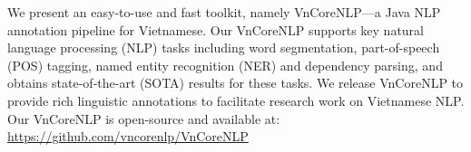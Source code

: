 We present an easy-to-use and fast toolkit, namely VnCoreNLP---a Java NLP annotation pipeline for Vietnamese. Our VnCoreNLP supports key natural language processing (NLP) tasks including  word segmentation, part-of-speech (POS) tagging, named entity recognition (NER) and dependency parsing, and obtains state-of-the-art (SOTA) results for these tasks.  We release VnCoreNLP to provide  rich linguistic annotations to facilitate research work on Vietnamese NLP.  Our VnCoreNLP is open-source and available at:  \url{https://github.com/vncorenlp/VnCoreNLP}
